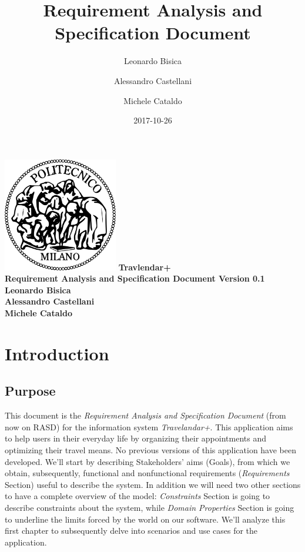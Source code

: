 \documentclass[12pt, a4paper]{article}
\title{Requirement Analysis and Specification Document}
\date{2017-10-26}
\author{
	Leonardo Bisica
	\and
	Alessandro Castellani
	\and
	Michele Cataldo
}
\begin{document}
	\begin{titlepage}
		\centering
		\includegraphics[width=5cm]{img/polimi_logo}
		\vfill
		{\bfseries\Large
			Travlendar+\\
			Requirement Analysis and Specification Document
			Version 0.1\\
			\vskip4cm
			Leonardo Bisica\\
			Alessandro Castellani\\
			Michele Cataldo\\
		}
		\vfill
		\vfill
	\end{titlepage}

	\tableofcontents
	
	
	
	\newpage
	\section{Introduction}
		\subsection{Purpose}
		
		This document is the \textit{Requirement Analysis and Specification Document} (from now on RASD) for the information system \textit{Travelandar+}.
		This application aims to help users in their everyday life by organizing their appointments and optimizing their travel means.
		No previous versions of this application have been developed. 
		We’ll start by describing Stakeholders’ aims (Goals), from which we obtain, subsequently, functional and nonfunctional requirements (\textit{Requirements} Section) useful to describe the system.
		In addition we will need two other sections to have a complete overview of the model: \textit{Constraints} Section is going to describe constraints about the system, while \textit{Domain Properties} Section is going to underline the limits forced by the world on our software.
		We'll analyze this first chapter to subsequently delve into scenarios and use cases for the application.
		
\end{document}
